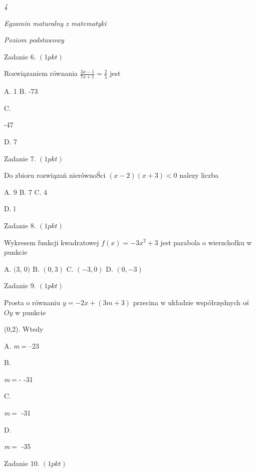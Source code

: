 \documentclass[a4paper,12pt]{article}
\begin{document}
{\it 4}

{\it Egzamin maturalny z matematyki}

{\it Poziom podstawowy}

Zadanie 6. $(1pkt)$

Rozwiązaniem równania $\displaystyle \frac{3x-1}{7x+1}=\frac{2}{5}$ jest

A. 1 B. -73

C.

-47

D. 7

Zadanie 7. $(1pkt)$

Do zbioru rozwiązań nierównoŚci $(x-2)(x+3)<0$ nalezy liczba

A. 9 B. 7 C. 4

D. l

Zadanie 8. $(1pkt)$

Wykresem funkcji kwadratowej $f(x)=-3x^{2}+3$ jest parabola o wierzchołku w punkcie

A. $($3, $0)$ B. $(0,3)$ C. $(-3,0)$ D. $(0,-3)$

Zadanie 9. $(1pkt)$

Prosta o równaniu $y=-2x+(3m+3)$ przecina w układzie współrzędnych oś $Oy$ w punkcie

(0,2). Wtedy

A. {\it m}$=$--23

B.

{\it m}$=$- -31

C.

{\it m}$=$ -31

D.

{\it m}$=$ -35

Zadanie 10. $(1pkt)$
\end{document}
